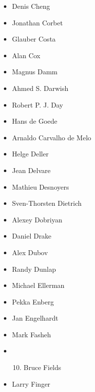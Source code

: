 \documentclass[a4paper,8pt,english]{sphinxmanual}
\begin{document}
\begin{itemize}
\item {} 
Denis Cheng

\item {} 
Jonathan Corbet

\item {} 
Glauber Costa

\item {} 
Alan Cox

\item {} 
Magnus Damm

\item {} 
Ahmed S. Darwish

\item {} 
Robert P. J. Day

\item {} 
Hans de Goede

\item {} 
Arnaldo Carvalho de Melo

\item {} 
Helge Deller

\item {} 
Jean Delvare

\item {} 
Mathieu Desnoyers

\item {} 
Sven-Thorsten Dietrich

\item {} 
Alexey Dobriyan

\item {} 
Daniel Drake

\item {} 
Alex Dubov

\item {} 
Randy Dunlap

\item {} 
Michael Ellerman

\item {} 
Pekka Enberg

\item {} 
Jan Engelhardt

\item {} 
Mark Fasheh

\item {} \begin{enumerate}
\setcounter{enumi}{9}
\item {} 
Bruce Fields

\end{enumerate}

\item {} 
Larry Finger


\end{itemize}
\end{document}
